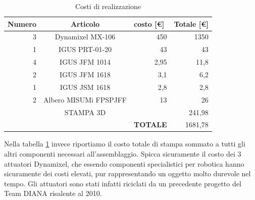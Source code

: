 \documentclass[%
corpo=11pt,
twoside,
 stile=classica,
oldstyle,
greek,%
]{toptesi}
\begin{document}
	\begin{table}[H]
		\centering
		\caption{Costi di realizzazione}
		\begin{tabular}{rrr|r|r|}
			\hline
			\multicolumn{1}{|l|}{\textbf{Numero}} & \multicolumn{2}{c|}{\textbf{Articolo}} & \multicolumn{1}{l|}{\textbf{costo [€]}} & \multicolumn{1}{l|}{\textbf{Totale [€]}} \bigstrut\\
			\hline
			\multicolumn{1}{|r|}{3} & \multicolumn{2}{c|}{Dynamixel MX-106} & 450   & 1350 \bigstrut\\
			\hline
			\multicolumn{1}{|r|}{1} & \multicolumn{2}{c|}{IGUS PRT-01-20} & 43    & 43 \bigstrut\\
			\hline
			\multicolumn{1}{|r|}{4} & \multicolumn{2}{c|}{IGUS JFM 1014} & 2,95  & 11,8 \bigstrut\\
			\hline
			\multicolumn{1}{|r|}{2} & \multicolumn{2}{c|}{IGUS JFM 1618} & 3,1   & 6,2 \bigstrut\\
			\hline
			\multicolumn{1}{|r|}{1} & \multicolumn{2}{c|}{IGUS JSM 1618} & 2,8   & 2,8 \bigstrut\\
			\hline
			\multicolumn{1}{|r|}{2} & \multicolumn{2}{c|}{Albero MISUMi FPSPJFF} & 13    & 26 \bigstrut\\
			\hline
			\multicolumn{1}{|r|}{} & \multicolumn{2}{c|}{STAMPA 3D} &       & 241,98 \bigstrut\\
			\hline
			&       &       & \textbf{TOTALE} & 1681,78 \bigstrut\\
			\cline{4-5}    \end{tabular}%
		\label{tab:projectcost}%
	\end{table}%
	Nella tabella \ref{tab:projectcost} invece riportiamo il costo totale di stampa sommato a tutti gli altri componenti necessari all'assemblaggio. Spicca sicuramente il costo dei 3 attuatori Dynamixel, che essendo componenti specialistici per robotica hanno sicuramente dei costi elevati, pur rappresentando un oggetto molto durevole nel tempo. Gli attuatori sono stati infatti riciclati da un precedente progetto del Team DIANA risalente al 2010. 
\end{document}
